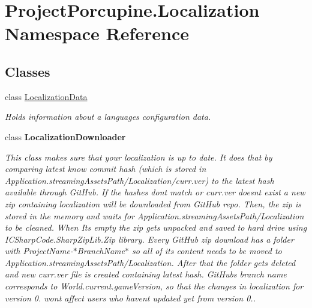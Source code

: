 \hypertarget{namespace_project_porcupine_1_1_localization}{}\section{Project\+Porcupine.\+Localization Namespace Reference}
\label{namespace_project_porcupine_1_1_localization}
\subsection*{Classes}
\begin{DoxyCompactItemize}
\item 
class \hyperlink{class_project_porcupine_1_1_localization_1_1_localization_data}{Localization\+Data}
\begin{DoxyCompactList}\small\item\em Holds information about a language\textquotesingle{}s configuration data. \end{DoxyCompactList}\item 
class {\bfseries Localization\+Downloader}
\begin{DoxyCompactList}\small\item\em This class makes sure that your localization is up to date. It does that by comparing latest know commit hash (which is stored in Application.\+streaming\+Assets\+Path/\+Localization/curr.ver) to the latest hash available through Git\+Hub. If the hashes don\textquotesingle{}t match or curr.\+ver doesn\textquotesingle{}t exist a new zip containing localization will be downloaded from Git\+Hub repo. Then, the zip is stored in the memory and waits for Application.\+streaming\+Assets\+Path/\+Localization to be cleaned. When It\textquotesingle{}s empty the zip gets unpacked and saved to hard drive using I\+C\+Sharp\+Code.\+Sharp\+Zip\+Lib.\+Zip library. Every Git\+Hub zip download has a folder with {\itshape Project\+Name}-\/$\ast$\+Branch\+Name$\ast$ so all of it\textquotesingle{}s content needs to be moved to Application.\+streaming\+Assets\+Path/\+Localization. After that the folder get\textquotesingle{}s deleted and new curr.\+ver file is created containing latest hash. Git\+Hub\textquotesingle{}s branch name corresponds to World.\+current.\+game\+Version, so that the changes in localization for version 0. won\textquotesingle{}t affect users who haven\textquotesingle{}t updated yet from version 0.. \end{DoxyCompactList}\item 

\end{DoxyCompactItemize}
